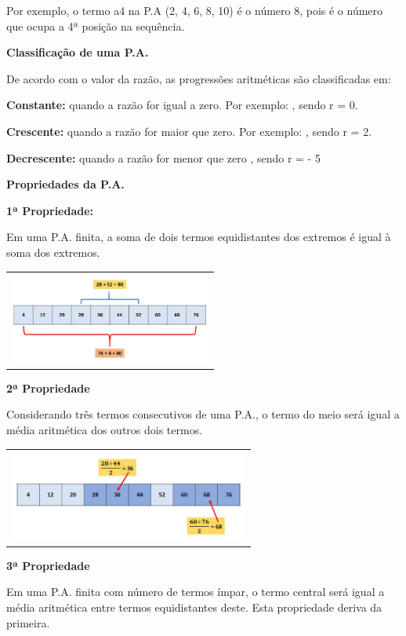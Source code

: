 \begin{multicols*}{2}
Por exemplo, o termo a4 na P.A (2, 4, 6, 8, 10) é o número 8, pois é o número que ocupa a 4ª posição na sequência.

\textbf{Classificação de uma P.A.}

De acordo com o valor da razão, as progressões aritméticas são classificadas em:

\textbf{Constante:} quando a razão for igual a zero. Por exemplo: , sendo r = 0.

\textbf{Crescente:} quando a razão for maior que zero. Por exemplo: , sendo r = 2.

\textbf{Decrescente:} quando a razão for menor que zero , sendo r = - 5

\textbf{Propriedades da P.A.}

\textbf{1ª Propriedade:}

Em uma P.A. finita, a soma de dois termos equidistantes dos extremos é igual à soma dos extremos.

		\begin{tabular}{@{}c@{}}
		  \includegraphics[height=30mm]{assets/papropriedade1.jpg}
		\end{tabular}
		
\textbf{2ª Propriedade}

Considerando três termos consecutivos de uma P.A., o termo do meio será igual a média aritmética dos outros dois termos.

		\begin{tabular}{@{}c@{}}
		  \includegraphics[height=30mm]{assets/papropriedade2.jpg}
		\end{tabular}

\textbf{3ª Propriedade}

Em uma P.A. finita com número de termos ímpar, o termo central será igual a média aritmética entre termos equidistantes deste. Esta propriedade deriva da primeira.


\end{multicols*}

